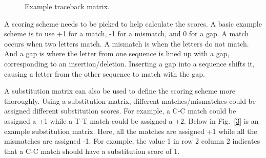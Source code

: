 \documentclass[conference]{IEEEtran}
\begin{document}
\begin{figure}[htbp]
\centerline{}
\caption{Example traceback matrix. \cite{vladimir}}
\label{2}
\end{figure}

A scoring scheme needs to be picked to help calculate the scores. A basic example scheme is to use +1 for a match, -1 for a mismatch, and 0 for a gap. A match occurs when two letters match. A mismatch is when the letters do not match. And a gap is where the letter from one sequence is lined up with a gap, corresponding to an insertion/deletion. Inserting a gap into a sequence shifts it, causing a letter from the other sequence to match with the gap.

A substitution matrix can also be used to define the scoring scheme more thoroughly. Using a substitution matrix, different matches/mismatches could be assigned different substitution scores. For example, a C-C match could be assigned a +1 while a T-T match could be assigned a +2. Below in Fig.~\ref{3} is an example substitution matrix. Here, all the matches are assigned +1 while all the mismatches are assigned -1. For example, the value 1 in row 2 column 2 indicates that a C-C match should have a substitution score of 1.
\end{document}
